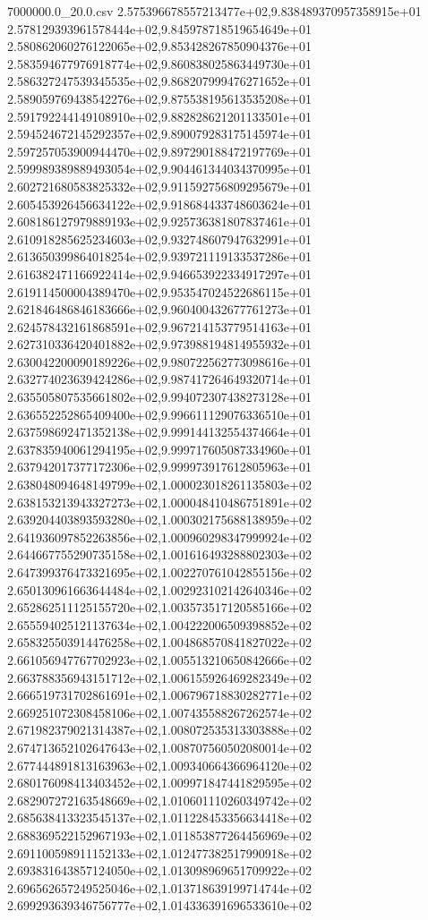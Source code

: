 \begin{filecontents*}{7000000.0_20.0.csv}
2.575396678557213477e+02,9.838489370957358915e+01
2.578129393961578444e+02,9.845978718519654649e+01
2.580862060276122065e+02,9.853428267850904376e+01
2.583594677976918774e+02,9.860838025863449730e+01
2.586327247539345535e+02,9.868207999476271652e+01
2.589059769438542276e+02,9.875538195613535208e+01
2.591792244149108910e+02,9.882828621201133501e+01
2.594524672145292357e+02,9.890079283175145974e+01
2.597257053900944470e+02,9.897290188472197769e+01
2.599989389889493054e+02,9.904461344034370995e+01
2.602721680583825332e+02,9.911592756809295679e+01
2.605453926456634122e+02,9.918684433748603624e+01
2.608186127979889193e+02,9.925736381807837461e+01
2.610918285625234603e+02,9.932748607947632991e+01
2.613650399864018254e+02,9.939721119133537286e+01
2.616382471166922414e+02,9.946653922334917297e+01
2.619114500004389470e+02,9.953547024522686115e+01
2.621846486846183666e+02,9.960400432677761273e+01
2.624578432161868591e+02,9.967214153779514163e+01
2.627310336420401882e+02,9.973988194814955932e+01
2.630042200090189226e+02,9.980722562773098616e+01
2.632774023639424286e+02,9.987417264649320714e+01
2.635505807535661802e+02,9.994072307438273128e+01
2.636552252865409400e+02,9.996611129076336510e+01
2.637598692471352138e+02,9.999144132554374664e+01
2.637835940061294195e+02,9.999717605087334960e+01
2.637942017377172306e+02,9.999973917612805963e+01
2.638048094648149799e+02,1.000023018261135803e+02
2.638153213943327273e+02,1.000048410486751891e+02
2.639204403893593280e+02,1.000302175688138959e+02
2.641936097852263856e+02,1.000960298347999924e+02
2.644667755290735158e+02,1.001616493288802303e+02
2.647399376473321695e+02,1.002270761042855156e+02
2.650130961663644484e+02,1.002923102142640346e+02
2.652862511125155720e+02,1.003573517120585166e+02
2.655594025121137634e+02,1.004222006509398852e+02
2.658325503914476258e+02,1.004868570841827022e+02
2.661056947767702923e+02,1.005513210650842666e+02
2.663788356943151712e+02,1.006155926469282349e+02
2.666519731702861691e+02,1.006796718830282771e+02
2.669251072308458106e+02,1.007435588267262574e+02
2.671982379021314387e+02,1.008072535313303888e+02
2.674713652102647643e+02,1.008707560502080014e+02
2.677444891813163963e+02,1.009340664366964120e+02
2.680176098413403452e+02,1.009971847441829595e+02
2.682907272163548669e+02,1.010601110260349742e+02
2.685638413323545137e+02,1.011228453356634418e+02
2.688369522152967193e+02,1.011853877264456969e+02
2.691100598911152133e+02,1.012477382517990918e+02
2.693831643857124050e+02,1.013098969651709922e+02
2.696562657249525046e+02,1.013718639199714744e+02
2.699293639346756777e+02,1.014336391696533610e+02

\end{filecontents*}
